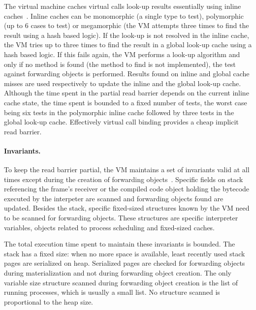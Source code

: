 \documentclass[sigplan,10pt,screen]{acmart}\settopmatter{printfolios=true,printccs=true,printacmref=true}
\begin{document}
The virtual machine caches virtual calls look-up results essentially using inline caches~\cite{PICSelf}. Inline caches can be monomorphic (a single type to test), polymorphic (up to 6 cases to test) or megamorphic (the VM attempts three times to find the result using a hash based logic). If the look-up is not resolved in the inline cache, the VM tries up to three times to find the result in a global look-up cache using a hash based logic. If this fails again, the VM performs a look-up algorithm and only if no method is found (the method to find is not implemented), the test against forwarding objects is performed. Results found on inline and global cache misses are used respectively to update the inline and the global look-up cache. Although the time spent in the partial read barrier depends on the current inline cache state, the time spent is bounded to a fixed number of tests, the worst case being six tests in the polymorphic inline cache followed by three tests in the global look-up cache. Effectively virtual call binding provides a cheap implicit read barrier.

\paragraph{Invariants.}
To keep the read barrier partial, the VM maintains a set of invariants valid at all times except during the creation of forwarding objects~\cite{Forwarders}. Specific fields on stack referencing the frame's receiver or the compiled code object holding the bytecode executed by the interpeter are scanned and forwarding objects found are updated. Besides the stack, specific fixed-sized structures known by the VM need to be scanned for forwarding objects. These structures are specific interpreter variables, objects related to process scheduling and fixed-sized caches. 

The total execution time spent to maintain these invariants is bounded. The stack has a fixed size: when no more space is available, least recently used stack pages are serialized on heap. Serialized pages are checked for forwarding objects during materialization and not during forwarding object creation. The only variable size structure scanned during forwarding object creation is the list of running processes, which is usually a small list. No structure scanned is proportional to the heap size.
\end{document}
